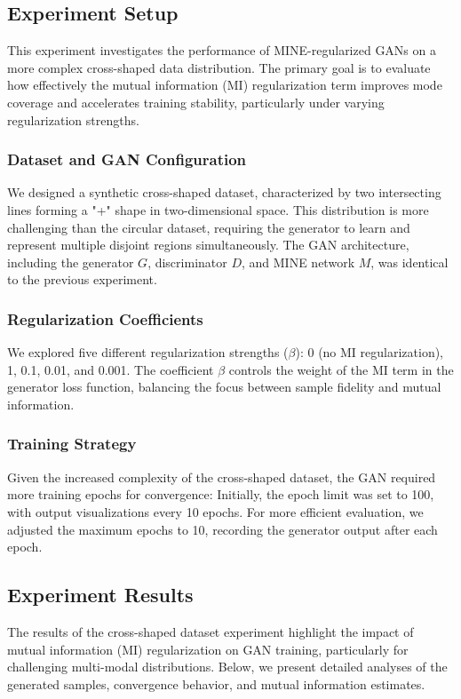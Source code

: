 \documentclass[lettersize,journal]{IEEEtran}
\begin{document}
\subsection{Experiment Setup}

This experiment investigates the performance of MINE-regularized GANs on a more complex cross-shaped data distribution. The primary goal is to evaluate how effectively the mutual information (MI) regularization term improves mode coverage and accelerates training stability, particularly under varying regularization strengths.

\subsubsection{Dataset and GAN Configuration}
We designed a synthetic cross-shaped dataset, characterized by two intersecting lines forming a "+" shape in two-dimensional space. This distribution is more challenging than the circular dataset, requiring the generator to learn and represent multiple disjoint regions simultaneously. The GAN architecture, including the generator \( G \), discriminator \( D \), and MINE network \( M \), was identical to the previous experiment.

\subsubsection{Regularization Coefficients}
We explored five different regularization strengths (\( \beta \)): 0 (no MI regularization), 1, 0.1, 0.01, and 0.001. The coefficient \( \beta \) controls the weight of the MI term in the generator loss function, balancing the focus between sample fidelity and mutual information.

\subsubsection{Training Strategy}
Given the increased complexity of the cross-shaped dataset, the GAN required more training epochs for convergence:
Initially, the epoch limit was set to 100, with output visualizations every 10 epochs.
For more efficient evaluation, we adjusted the maximum epochs to 10, recording the generator output after each epoch.

\subsection{Experiment Results}

The results of the cross-shaped dataset experiment highlight the impact of mutual information (MI) regularization on GAN training, particularly for challenging multi-modal distributions. Below, we present detailed analyses of the generated samples, convergence behavior, and mutual information estimates.
\end{document}
